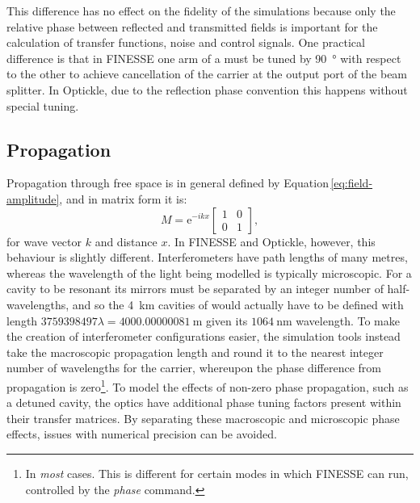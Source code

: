 This difference has no effect on the fidelity of the simulations because only the relative phase between reflected and transmitted fields is important for the calculation of transfer functions, noise and control signals. One practical difference is that in \gls{FINESSE} one arm of a \MI{} must be tuned by \SI{90}{\degree} with respect to the other to achieve cancellation of the carrier at the output port of the beam splitter. In Optickle, due to the reflection phase convention this happens without special tuning.

\subsection{Propagation}
Propagation through free space is in general defined by Equation\,\ref{eq:field-amplitude}, and in matrix form it is:
\begin{equation}
  M = \text{e}^{-ikx}
  \begin{bmatrix}
    1 & 0 \\
    0 & 1
  \end{bmatrix}
  ,
\end{equation}
for wave vector $k$ and distance $x$. In \gls{FINESSE} and Optickle, however, this behaviour is slightly different. Interferometers have path lengths of many metres, whereas the wavelength of the light being modelled is typically microscopic. For a cavity to be resonant its mirrors must be separated by an integer number of half-wavelengths, and so the \SI{4}{\kilo\meter} \FP{} cavities of \ALIGO{} would actually have to be defined with length $\num{3759398497}\lambda = \SI{4000.00000081}{\meter}$ given its $\SI{1064}{\nano\meter}$ wavelength. To make the creation of interferometer configurations easier, the simulation tools instead take the macroscopic propagation length and round it to the nearest integer number of wavelengths for the carrier, whereupon the phase difference from propagation is zero\footnote{In \emph{most} cases. This is different for certain modes in which \gls{FINESSE} can run, controlled by the \emph{phase} command.}. To model the effects of non-zero phase propagation, such as a detuned cavity, the optics have additional phase tuning factors present within their transfer matrices. By separating these macroscopic and microscopic phase effects, issues with numerical precision can be avoided.

